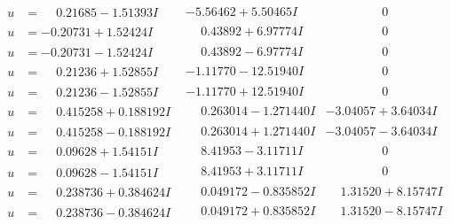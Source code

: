 \documentclass[1p]{elsarticle_modified}
\theoremstyle{definition}
\begin{document}
$$\begin{array}{c|c|c}
\begin{aligned}
u &= \phantom{-}0.21685 - 1.51393 I\end{aligned}
 & -5.56462 + 5.50465 I & \phantom{-0.000000 } 0 \\ \hline\begin{aligned}
u &= -0.20731 + 1.52424 I\end{aligned}
 & \phantom{-}0.43892 + 6.97774 I & \phantom{-0.000000 } 0 \\ \hline\begin{aligned}
u &= -0.20731 - 1.52424 I\end{aligned}
 & \phantom{-}0.43892 - 6.97774 I & \phantom{-0.000000 } 0 \\ \hline\begin{aligned}
u &= \phantom{-}0.21236 + 1.52855 I\end{aligned}
 & -1.11770 - 12.51940 I & \phantom{-0.000000 } 0 \\ \hline\begin{aligned}
u &= \phantom{-}0.21236 - 1.52855 I\end{aligned}
 & -1.11770 + 12.51940 I & \phantom{-0.000000 } 0 \\ \hline\begin{aligned}
u &= \phantom{-}0.415258 + 0.188192 I\end{aligned}
 & \phantom{-}0.263014 - 1.271440 I & -3.04057 + 3.64034 I \\ \hline\begin{aligned}
u &= \phantom{-}0.415258 - 0.188192 I\end{aligned}
 & \phantom{-}0.263014 + 1.271440 I & -3.04057 - 3.64034 I \\ \hline\begin{aligned}
u &= \phantom{-}0.09628 + 1.54151 I\end{aligned}
 & \phantom{-}8.41953 - 3.11711 I & \phantom{-0.000000 } 0 \\ \hline\begin{aligned}
u &= \phantom{-}0.09628 - 1.54151 I\end{aligned}
 & \phantom{-}8.41953 + 3.11711 I & \phantom{-0.000000 } 0 \\ \hline\begin{aligned}
u &= \phantom{-}0.238736 + 0.384624 I\end{aligned}
 & \phantom{-}0.049172 - 0.835852 I & \phantom{-}1.31520 + 8.15747 I \\ \hline\begin{aligned}
u &= \phantom{-}0.238736 - 0.384624 I\end{aligned}
 & \phantom{-}0.049172 + 0.835852 I & \phantom{-}1.31520 - 8.15747 I \\ \hline\begin{aligned}

\end{aligned}
\end{array}$$
\end{document}
